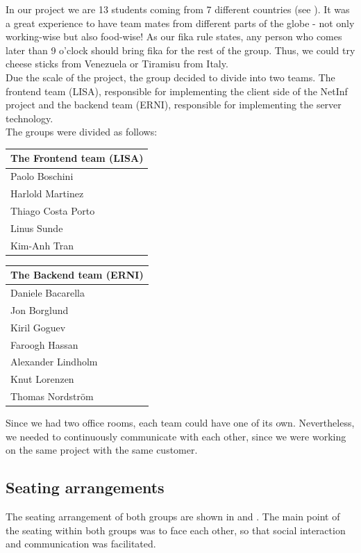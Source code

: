 In our project we are 13 students coming from 7 different countries (see ).
It was a great experience to have team mates from different parts of the globe - not
only working-wise but also food-wise! As our fika rule states, any person who comes later
than 9 o'clock should bring fika for the rest of the group. Thus, we could
try cheese sticks from Venezuela or Tiramisu from Italy.\\

Due the scale of the project, the group decided to divide into two teams. 
The frontend team (LISA), responsible for implementing the client side of the NetInf project and the backend team (ERNI), responsible for implementing the server technology.\\

The groups were divided as follows:

\begin{minipage}[b]{0.32\hsize}\centering
\begin{tabular}{l}
The Frontend team (LISA) \\\hline
Paolo Boschini\\
Harlold Martinez\\
Thiago Costa Porto\\
Linus Sunde\\
Kim-Anh Tran
\end{tabular}
\end{minipage}
\hfill
\begin{minipage}[b]{0.32\hsize}\centering
\begin{tabular}{l}
The Backend team (ERNI) \\\hline
Daniele Bacarella\\
Jon Borglund\\
Kiril Goguev\\
Faroogh Hassan\\
Alexander Lindholm\\
Knut Lorenzen\\
Thomas Nordstr\"om
\end{tabular}
\end{minipage}

Since we had two office rooms, each team could have one of its own.
Nevertheless, we needed to continuously communicate with each other,
since we were working on the same project with the same customer.

\subsection{Seating arrangements}
The seating arrangement of both groups are shown in  and
. The main point of the seating within both groups
was to face each other, so that social interaction and communication was facilitated. 

